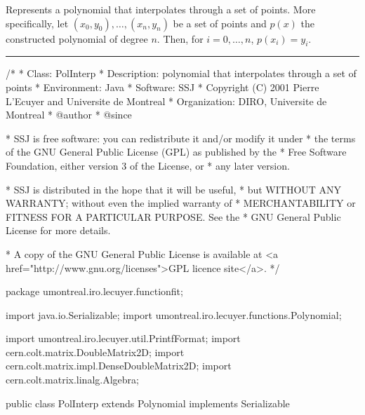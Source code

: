 
Represents a polynomial that interpolates through a set of points. More
specifically, let $(x_0,y_0), \ldots, (x_n, y_n)$ be a set of points and
$p(x)$ the constructed polynomial of degree $n$. Then, for $i=0,\ldots,n$,
$p(x_i)=y_i$.

\bigskip\hrule

\begin{code}
\begin{hide}
/*
 * Class:        PolInterp
 * Description:  polynomial that interpolates through a set of points
 * Environment:  Java
 * Software:     SSJ 
 * Copyright (C) 2001  Pierre L'Ecuyer and Universite de Montreal
 * Organization: DIRO, Universite de Montreal
 * @author       
 * @since

 * SSJ is free software: you can redistribute it and/or modify it under
 * the terms of the GNU General Public License (GPL) as published by the
 * Free Software Foundation, either version 3 of the License, or
 * any later version.

 * SSJ is distributed in the hope that it will be useful,
 * but WITHOUT ANY WARRANTY; without even the implied warranty of
 * MERCHANTABILITY or FITNESS FOR A PARTICULAR PURPOSE.  See the
 * GNU General Public License for more details.

 * A copy of the GNU General Public License is available at
   <a href="http://www.gnu.org/licenses">GPL licence site</a>.
 */
\end{hide}
package umontreal.iro.lecuyer.functionfit;\begin{hide}

import java.io.Serializable;
import umontreal.iro.lecuyer.functions.Polynomial;

import umontreal.iro.lecuyer.util.PrintfFormat;
import cern.colt.matrix.DoubleMatrix2D;
import cern.colt.matrix.impl.DenseDoubleMatrix2D;
import cern.colt.matrix.linalg.Algebra;
\end{hide}

public class PolInterp extends Polynomial implements Serializable\begin{hide} {
   private static final long serialVersionUID = -710451931485296501L;
   private static final Algebra alg = new Algebra ();
   private double[] x;
   private double[] y;
\end{hide}
\end{code}

